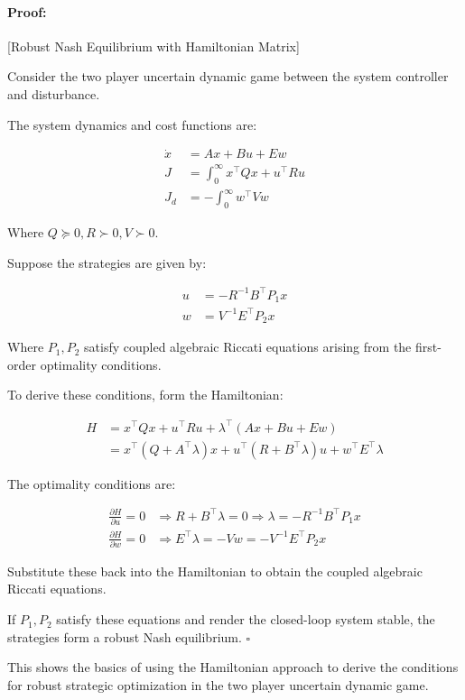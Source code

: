\documentclass[3p]{elsarticle}
\newenvironment{proof}{\paragraph{Proof:}}{\hfill$\square$}
\begin{document}
\begin{proof}[Robust Nash Equilibrium with Hamiltonian Matrix]

Consider the two player uncertain dynamic game between the system controller and disturbance. 

The system dynamics and cost functions are:

\begin{align*}
\dot{x} &= Ax + Bu + Ew \\
J &= \int_0^\infty x^\top Q x + u^\top R u \\
J_d &= -\int_0^\infty w^\top V w
\end{align*}

Where $Q \succeq 0, R \succ 0, V \succ 0$. 

Suppose the strategies are given by:

\begin{align*} 
u &= -R^{-1}B^\top P_1 x \\
w &= V^{-1}E^\top P_2 x
\end{align*}

Where $P_1, P_2$ satisfy coupled algebraic Riccati equations arising from the first-order optimality conditions.

To derive these conditions, form the Hamiltonian:

\begin{align*}
H &= x^\top Q x + u^\top R u + \lambda^\top (Ax + Bu + Ew) \\
&= x^\top (Q + A^\top \lambda) x + u^\top (R + B^\top \lambda) u + w^\top E^\top \lambda
\end{align*}

The optimality conditions are:

\begin{align*}
\frac{\partial H}{\partial u} = 0 &\Rightarrow R + B^\top \lambda = 0 \Rightarrow \lambda = -R^{-1}B^\top P_1 x\\
\frac{\partial H}{\partial w} = 0 &\Rightarrow E^\top \lambda = -Vw = -V^{-1}E^\top P_2 x
\end{align*}

Substitute these back into the Hamiltonian to obtain the coupled algebraic Riccati equations.

If $P_1, P_2$ satisfy these equations and render the closed-loop system stable, the strategies form a robust Nash equilibrium.
\end{proof}

This shows the basics of using the Hamiltonian approach to derive the conditions for robust strategic optimization in the two player uncertain dynamic game.
\end{document}
